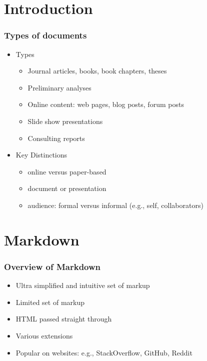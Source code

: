 \section{Introduction}

\begin{frame}\frametitle{Types of documents}

\begin{itemize}
\item
  Types

  \begin{itemize}
  \item
    Journal articles, books, book chapters, theses
  \item
    Preliminary analyses
  \item
    Online content: web pages, blog posts, forum posts
  \item
    Slide show presentations
  \item
    Consulting reports
  \end{itemize}
\item
  Key Distinctions

  \begin{itemize}
  \item
    online versus paper-based
  \item
    document or presentation
  \item
    audience: formal versus informal (e.g., self, collaborators)
  \end{itemize}
\end{itemize}

\end{frame}

\section{Markdown}

\begin{frame}\frametitle{Overview of Markdown}

\begin{itemize}
\item
  Ultra simplified and intuitive set of markup
\item
  Limited set of markup
\item
  HTML passed straight through
\item
  Various extensions
\item
  Popular on websites: e.g., StackOverflow, GitHub, Reddit
\end{itemize}

\end{frame}

